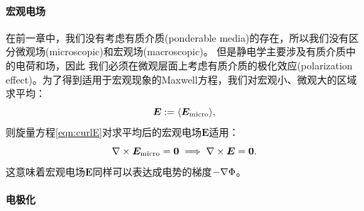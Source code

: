 \paragraph{宏观电场}
在前一章中，我们没有考虑有质介质(ponderable media)的存在，所以我们没有区分微观场(microscopic)和宏观场(macroscopic)。
但是静电学主要涉及有质介质中的电荷和场，因此%
我们必须在微观层面上考虑有质介质的极化效应(polarization effect)。为了得到适用于宏观现象的Maxwell方程，我们对宏观小、微观大的区域求平均：%
\begin{equation}
    \label{eq:ed-macroscopic-electric-field}
    \bm E := \langle\bm E_\text{micro}\rangle,
\end{equation}
则旋量方程\eqref{eqn:curlE}对求平均后的宏观电场$\bm E$适用：
\begin{equation}
    \label{eqn:curlE-macro}
    \nabla\times\bm E_\text{micro} = \bm 0 \implies \nabla\times\bm E = \bm 0.
\end{equation}
这意味着宏观电场$\bm E$同样可以表达成电势的梯度$-\nabla\Phi$。

\paragraph{电极化}

